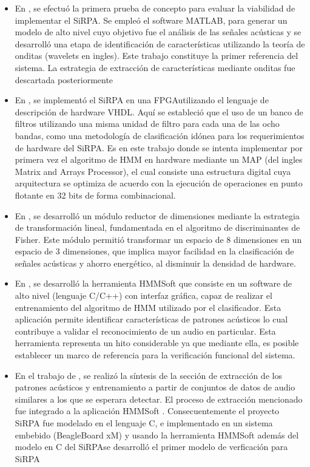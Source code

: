\begin{itemize}

\item {En \cite{MSaenz}, se efectuó la primera prueba de concepto para evaluar la viabilidad de implementar el SiRPA. Se empleó el software MATLAB, para generar un modelo de alto nivel cuyo objetivo fue el análisis de las señales acústicas y se desarrolló una etapa de identificación de características utilizando la teoría de onditas (wavelets en ingles). Este trabajo constituye la primer referencia del sistema. La estrategia de extracción de características mediante onditas fue descartada posteriormente}

\item {En \cite{Esalas}, se implementó el SiRPA en una FPGAutilizando el lenguaje de descripción de hardware VHDL. Aquí se estableció que el uso de un banco de filtros utilizando una misma unidad de filtro para cada una de las ocho bandas, como una metodología de clasificación idónea para los requerimientos de hardware del SiRPA. Es en este trabajo donde se intenta implementar por primera vez el algoritmo de HMM en hardware mediante un MAP (del ingles Matrix and Arrays Processor), el cual consiste una estructura digital cuya arquitectura se optimiza de acuerdo con la ejecución de operaciones en punto flotante en 32 bits de forma combinacional.}

\item {En \cite{Msequeira}, se desarrolló un módulo reductor de dimensiones mediante la estrategia de transformación lineal, fundamentada en el algoritmo de discriminantes de Fisher. Este módulo permitió transformar un espacio de 8 dimensiones en un espacio de 3 dimensiones, que implica mayor facilidad en la clasificación de señales acústicas y ahorro energético, al disminuir la densidad de hardware.}

\item {En \cite{Jcardenas}, se desarrolló la herramienta HMMSoft que consiste en un software de alto nivel (lenguaje C/C++) con interfaz gráfica, capaz de realizar el entrenamiento del algoritmo de HMM utilizado por el clasificador. Esta aplicación permite identificar características de patrones acústicos lo cual contribuye a validar el reconocimiento de un audio en particular. Esta herramienta representa un hito considerable ya que mediante ella, es posible establecer un marco de referencia para la verificación funcional del sistema.}

\item {En el trabajo de \cite{Jordanthesis}, se realizó la síntesis de la sección de extracción de los patrones acústicos y entrenamiento a partir de conjuntos de datos de audio similares a los que se esperara detectar. El proceso de extracción mencionado fue integrado a la aplicación HMMSoft \cite{Jcardenas}. Consecuentemente el proyecto SiRPA fue modelado en el lenguaje C, e implementado en un sistema embebido (BeagleBoard xM)  \cite{website:beagleboard} y usando la herramienta HMMSoft además del modelo en C del SiRPAse desarrolló el primer modelo de verficación para SiRPA} 


\end{itemize}
